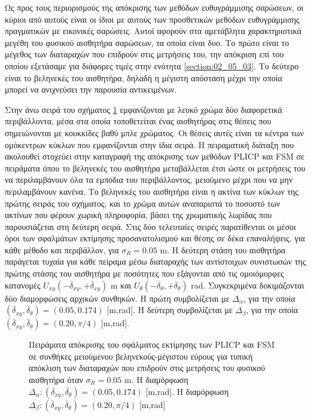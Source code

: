 Ως προς τους περιορισμούς της απόκρισης των μεθόδων ευθυγράμμισης σαρώσεων, οι
κύριοι από αυτούς είναι οι ίδιοι με αυτούς των προσθετικών μεθόδων
ευθυγράμμισης πραγματικών με εικονικές σαρώσεις. Αυτοί αφορούν στα αμετάβλητα
χαρακτηριστικά μεγέθη του φυσικού αισθητήρα σαρώσεων, τα οποία είναι δυο. Το
πρώτο είναι το μέγεθος των διαταραχών που επιδρούν στις μετρήσεις του, την
απόκριση επί του οποίου εξετάσαμε για διάφορες τιμές στην ενότητα
\ref{section:02_05_03}. Το δεύτερο είναι το βεληνεκές του αισθητήρα, δηλαδή η
μέγιστη απόσταση μέχρι την οποία μπορεί να ανιχνεύσει την παρουσία
αντικειμένων.

Στην άνω σειρά του σχήματος \ref{fig:02_05_04:04} εμφανίζονται με λευκό χρώμα
δύο διαφορετικά περιβάλλοντα, μέσα στα οποία τοποθετείται ένας αισθητήρας στις
θέσεις που σημειώνονται με κουκκίδες βαθύ μπλε χρώματος. Οι θέσεις αυτές είναι
τα κέντρα των ομόκεντρων κύκλων που εμφανίζονται στην ίδια σειρά. Η πειραματική
διάταξη που ακολουθεί στοχεύει στην καταγραφή της απόκρισης των μεθόδων
PLICP και FSM σε πειράματα όπου το βεληνεκές του αισθητήρα
μεταβάλλεται έτσι ώστε οι μετρήσεις του να περιλαμβάνουν όλα τα εμπόδια του
περιβάλλοντος, μειούμενο μέχρι που να μην περιλαμβάνουν κανένα. Το βεληνεκές
του αισθητήρα είναι η ακτίνα των κύκλων της πρώτης σειράς του σχήματος, και το
χρώμα αυτών αναπαριστά το ποσοστό των ακτίνων που φέρουν χωρική πληροφορία,
βάσει της χρωματικής λωρίδας που παρουσιάζεται στη δεύτερη σειρά. Στις δύο
τελευταίες σειρές παρατίθενται οι μέσοι όροι των σφαλμάτων εκτίμησης
προσανατολισμού και θέσης σε δέκα επαναλήψεις, για κάθε μέθοδο και περιβάλλον,
για $\sigma_R = 0.05$ m. Η δεύτερη στάση του αισθητήρα παράγεται τυχαία για
κάθε πείραμα μέσω διαταραχής των αντίστοιχων συνιστωσών της πρώτης στάσης του
αισθητήρα με ποσότητες που εξάγονται από τις ομοιόμορφες κατανομές
$U_{xy}(-\overline{\delta}_{xy},+\overline{\delta}_{xy})$ m και
$U_{\theta}(-\overline{\delta}_{\theta},+\overline{\delta}_{\theta})$ rad.
Συγκεκριμένα δοκιμάζονται δύο διαμορφώσεις αρχικών συνθηκών. H πρώτη
συμβολίζεται με $\Delta_\alpha$, για την οποία
$(\overline{\delta}_{xy}, \overline{\delta}_{\theta}) = (0.05,0.174)$ [m,rad].
Η δεύτερη συμβολίζεται με $\Delta_\beta$, για την οποία
$(\overline{\delta}_{xy},\overline{\delta}_{\theta}) = (0.20,\pi/4)$ [m,rad].

\begin{figure}[]\centering
  
  \vspace{-2cm}
  \caption{\small Πειράματα απόκρισης του σφάλματος εκτίμησης των PLICP
           και FSM σε συνθήκες μειούμενου βεληνεκούς-μέγιστου εύρους
           για τυπική απόκλιση των διαταραχών που επιδρούν στις μετρήσεις του
           φυσικού αισθητήρα όταν $\sigma_R = 0.05$ m. Η διαμόρφωση
           $\Delta_\alpha: (\overline{\delta}_{xy}, \overline{\delta}_{\theta})
           = (0.05,0.174)$ [m,rad]. Η διαμόρφωση $\Delta_\beta:
           (\overline{\delta}_{xy},\overline{\delta}_{\theta}) = (0.20,\pi/4)$
           [m,rad]}
  \label{fig:02_05_04:04}
\end{figure}

